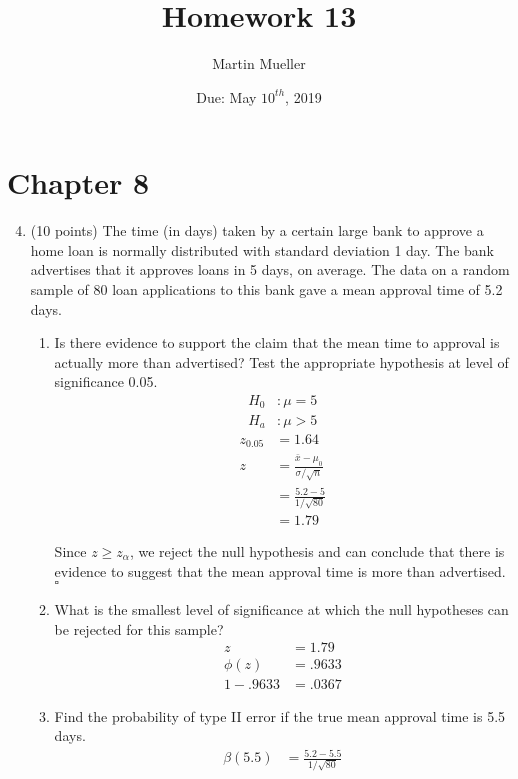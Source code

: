 \documentclass[12pt, letter]{article}
\title{Homework 13}
\author{Martin Mueller}
\date{Due: May $10^{th}$, 2019}
\newenvironment{nscenter}
	{\parskip=0pt\par\nopagebreak\centering}
	{\par\noindent\ignorespacesafterend}
\begin{document}
\maketitle

\section*{Chapter 8}

\begin{enumerate}
	\setcounter{enumi}{3}
	\item (10 points) The time (in days) taken by a certain large bank to approve a home loan is normally distributed with standard deviation 1 day. The bank advertises that it approves loans in 5 days, on average. The data on a random sample of 80 loan applications to this bank gave a mean approval time of 5.2 days.
	\begin{enumerate}
		\item Is there evidence to support the claim that the mean time to approval is actually more than advertised? Test the appropriate hypothesis at level of significance 0.05.
		\begin{align*}
			H_{0}&: \mu = 5 \\
			H_{a}&: \mu > 5
		\end{align*}
		\begin{align*}
			z_{0.05} &= 1.64 \\
			z &= \frac{\bar{x} - \mu_{0}}{\sigma / \sqrt{n}} \\
			&= \frac{5.2 - 5}{1 / \sqrt{80}} \\
			&= 1.79
		\end{align*}
		\begin{nscenter}
			Since $z \geq z_{\alpha}$, we reject the null hypothesis and can conclude that there is evidence to suggest that the mean approval time is more than advertised. $\square$
		\end{nscenter}
		\item What is the smallest level of significance at which the null hypotheses can be rejected for this sample?
		\begin{align*}
			z &= 1.79 \\
			\phi(z) &= .9633 \\
			1 - .9633 &= \boxed{.0367}
		\end{align*}
		\item Find the probability of type II error if the true mean approval time is 5.5 days.
		\begin{align*}
			\beta(5.5) &= \frac{5.2 - 5.5}{1 / \sqrt{80}} \\

\end{align*}
\end{enumerate}
\end{enumerate}
\end{document}
